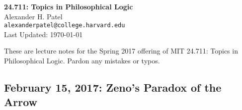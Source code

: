 \documentclass[12pt]{article}
\theoremstyle{definition}
\begin{document}
\begin{center}
\textbf{24.711: Topics in Philosophical Logic} \\
Alexander H. Patel \\
{\tt alexanderpatel@college.harvard.edu} \\
Last Updated: \today
\end{center}

These are lecture notes for the Spring 2017 offering of MIT 24.711: Topics in
Philosophical Logic. Pardon any mistakes or typos.

\tableofcontents

\subsection{February 15, 2017: Zeno's Paradox of the Arrow}
\end{document}
